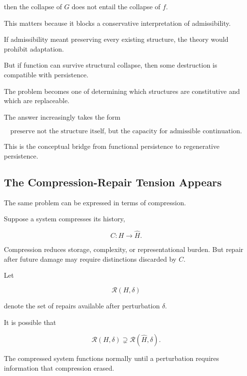 \documentclass[11pt]{article}
\theoremstyle{remark}
\begin{document}
then the collapse of $G$ does not entail the collapse of $f$.

This matters because it blocks a conservative interpretation of admissibility.

If admissibility meant preserving every existing structure, the theory would prohibit adaptation.

But if function can survive structural collapse, then some destruction is compatible with persistence.

The problem becomes one of determining which structures are constitutive and which are replaceable.

The answer increasingly takes the form

\begin{equation}
\text{preserve not the structure itself, but the capacity for admissible continuation}.
\end{equation}

This is the conceptual bridge from functional persistence to regenerative persistence.

\subsection{The Compression-Repair Tension Appears}

The same problem can be expressed in terms of compression.

Suppose a system compresses its history,

\begin{equation}
C:H\rightarrow \hat{H}.
\end{equation}

Compression reduces storage, complexity, or representational burden. But repair after future damage may require distinctions discarded by $C$.

Let

\begin{equation}
\mathcal{R}(H,\delta)
\end{equation}

denote the set of repairs available after perturbation $\delta$.

It is possible that

\begin{equation}
\mathcal{R}(H,\delta)
\supsetneq
\mathcal{R}(\hat{H},\delta).
\end{equation}

The compressed system functions normally until a perturbation requires information that compression erased.
\end{document}
